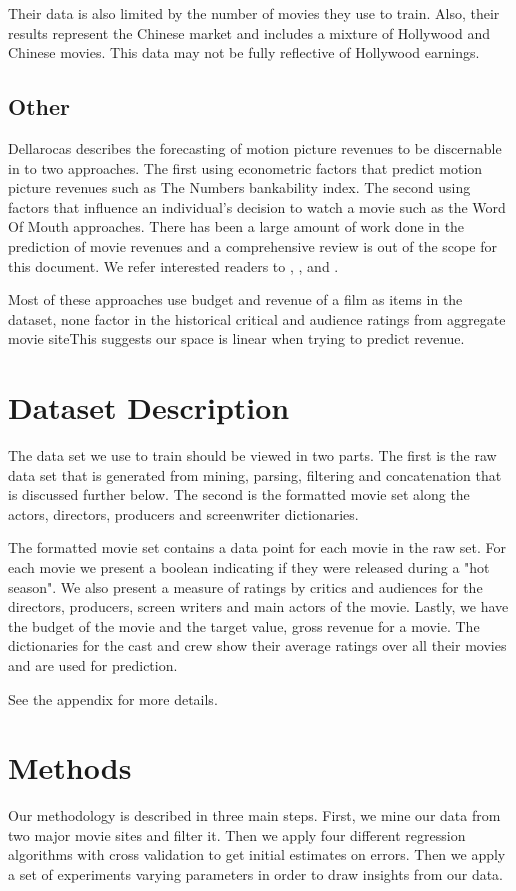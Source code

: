 \documentclass[conference]{IEEEtran}
\begin{document}
Their data is also limited by the number of movies they use to train. Also,
their results represent the Chinese market and includes a mixture of Hollywood
and Chinese movies. This data may not be fully reflective of Hollywood earnings. 

\subsection{Other}
Dellarocas \cite{dellarocas} describes the forecasting of motion picture 
revenues to be discernable in to two approaches. The first using 
econometric factors that predict motion picture revenues such 
as The Numbers bankability index. The second using factors that 
influence an individual's decision to watch a movie such as the 
Word Of Mouth approaches. There has been a large amount of work done 
in the prediction of movie revenues and a comprehensive review is out
of the scope for this document. We refer interested readers to \cite{litman-kohl},
\cite{el-el}, \cite{sawhey} and \cite{sochay}.

Most of these approaches use budget and revenue of a film as items in the 
dataset, none factor in the historical critical and audience ratings 
from aggregate movie siteThis suggests our space is linear when trying to predict revenue. 

\section{Dataset Description}
The data set we use to train should be viewed in two parts. The first is the raw data set that 
is generated from mining, parsing, filtering and concatenation that is discussed further
below. The second is the formatted movie set along the actors, directors, producers and screenwriter dictionaries. 

The formatted movie set contains a data point for each movie in the raw set. For each movie we present a boolean 
indicating if they were released during a "hot season". We also present a measure of ratings
by critics and audiences for the directors, producers, screen writers and main actors of the movie. 
Lastly, we have the budget of the movie and the target value, gross revenue for a movie. The dictionaries for 
the cast and crew show their average ratings over all their movies and are used for prediction.

See the appendix for more details.

\section{Methods}
Our methodology is described in three main steps. First, we mine our data from 
two major movie sites and filter it. Then we apply four different regression algorithms 
with cross validation to get initial estimates on errors. Then we apply a set of experiments 
varying parameters in order to draw insights from our data.
\end{document}
